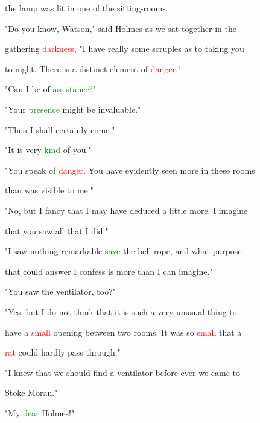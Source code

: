  the lamp was lit in one of the sitting-rooms.



 "Do you know, Watson," said Holmes as we sat together in the

 gathering \textcolor{red}{darkness,} "I have really some scruples as to taking you

 to-night. There is a distinct element of \textcolor{red}{danger."}



 "Can I be of \textcolor{green}{assistance?"}



 "Your \textcolor{green}{presence} might be invaluable."



 "Then I shall certainly come."



 "It is very \textcolor{green}{kind} of you."



 "You speak of \textcolor{red}{danger.} You have evidently seen more in these rooms

 than was visible to me."



 "No, but I \textcolor{BurntOrange}{fancy} that I may have deduced a little more. I imagine

 that you saw all that I did."



 "I saw nothing \textcolor{BurntOrange}{remarkable} \textcolor{green}{save} the bell-rope, and what purpose

 that could answer I \textcolor{BurntOrange}{confess} is more than I can imagine."



 "You saw the ventilator, too?"



 "Yes, but I do not think that it is such a very unusual thing to

 have a \textcolor{red}{small} opening between two rooms. It was so \textcolor{red}{small} that a

 \textcolor{red}{rat} could hardly pass through."



 "I knew that we should find a ventilator before ever we came to

 Stoke Moran."



 "My \textcolor{green}{dear} Holmes!"



